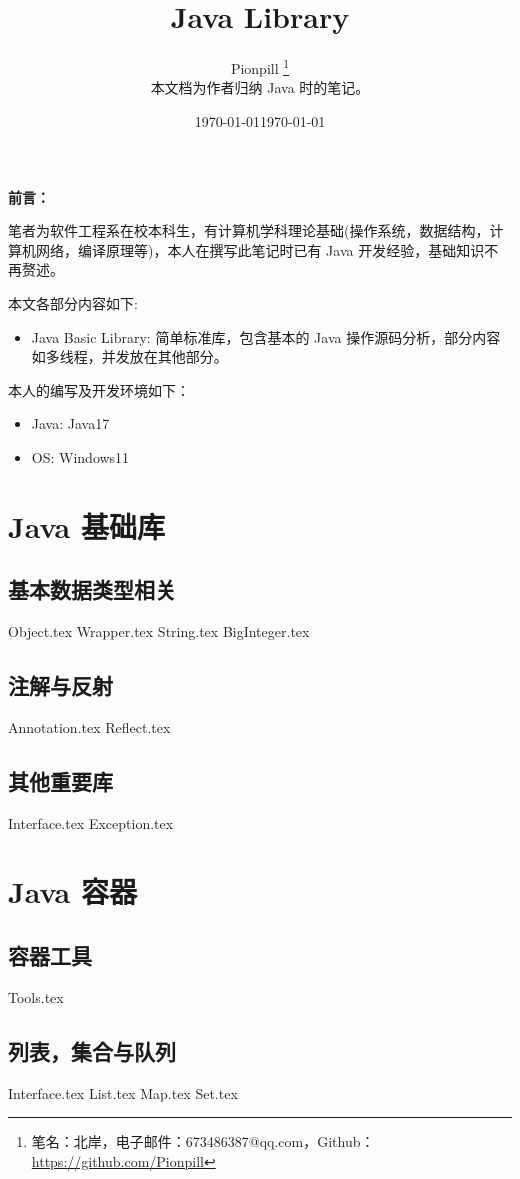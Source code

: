 \documentclass{PionpillNote-book}
\title{Java Library}
\author{
    Pionpill \footnote{笔名：北岸，电子邮件：673486387@qq.com，Github：\url{https://github.com/Pionpill}} \\
    本文档为作者归纳 Java 时的笔记。\\
}
\date{\today}
\begin{document}
\pagestyle{plain}
\maketitle

\noindent\textbf{前言：}

笔者为软件工程系在校本科生，有计算机学科理论基础(操作系统，数据结构，计算机网络，编译原理等)，本人在撰写此笔记时已有 Java 开发经验，基础知识不再赘述。

本文各部分内容如下:
\begin{itemize}
    \item Java Basic Library: 简单标准库，包含基本的 Java 操作源码分析，部分内容如多线程，并发放在其他部分。
\end{itemize}

本人的编写及开发环境如下：
\begin{itemize}
    \item Java: Java17
    \item OS: Windows11
\end{itemize}

\date{\today}
\newpage

\tableofcontents

\newpage

\setcounter{page}{1} 
\pagestyle{fancy}

\part{Java 基础库}
\chapter{基本数据类型相关}
{Object.tex}
{Wrapper.tex}
{String.tex}
{BigInteger.tex}
\chapter{注解与反射}
{Annotation.tex}
{Reflect.tex}
\chapter{其他重要库}
{Interface.tex}
{Exception.tex}

\part{Java 容器}
\chapter{容器工具}
{Tools.tex}
\chapter{列表，集合与队列}
{Interface.tex}
{List.tex}
{Map.tex}
{Set.tex}
\end{document}
